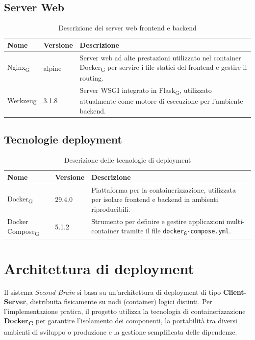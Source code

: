 \documentclass[11pt,a4paper]{article}
\newcommand{\gls}[1]{#1\textsubscript{G}}
\begin{document}
\subsection{Server Web}
\begin{table}[H]
    \centering
    \begin{tabular}{|p{}|p{}|p{}|}
        \hline
        \textbf{Nome} & \textbf{Versione} & \textbf{Descrizione} \\
        \hline
        \gls{Nginx} & alpine & Server web ad alte prestazioni utilizzato nel container \gls{Docker} per servire i file statici del frontend e gestire il routing. \\
        \hline
        Werkzeug & 3.1.8 & Server WSGI integrato in \gls{Flask}, utilizzato attualmente come motore di esecuzione per l'ambiente backend. \\
        \hline
    \end{tabular}
    \caption{Descrizione dei server web frontend e backend}
    \label{tab:server_web}
\end{table}

\subsection{Tecnologie deployment}
\begin{table}[H]
    \centering
    \begin{tabular}{|p{}|p{}|p{}|}
        \hline
        \textbf{Nome} & \textbf{Versione} & \textbf{Descrizione} \\
        \hline
        \gls{Docker} & 29.4.0 & Piattaforma per la containerizzazione, utilizzata per isolare frontend e backend in ambienti riproducibili. \\
        \hline
        \gls{Docker Compose} & 5.1.2 & Strumento per definire e gestire applicazioni multi-container tramite il file \texttt{\gls{docker}-compose.yml}. \\
        \hline
    \end{tabular}
    \caption{Descrizione delle tecnologie di deployment}
    \label{tab:tecnologie_deployment}
\end{table}

\newpage

\section{Architettura di deployment}
Il sistema \textit{Second Brain} si basa su un'architettura di deployment di tipo \textbf{Client-Server}, distribuita fisicamente su nodi (container) logici distinti. Per l'implementazione pratica, il progetto utilizza la tecnologia di containerizzazione \textbf{\gls{Docker}} per garantire l'isolamento dei componenti, la portabilità tra diversi ambienti di sviluppo o produzione e la gestione semplificata delle dipendenze.
\end{document}
